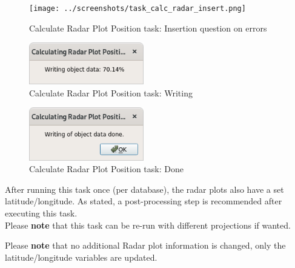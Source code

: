 \begin{figure}[H]
  \center
    \texttt{[image: ../screenshots/task\_calc\_radar\_insert.png]}
  \caption{Calculate Radar Plot Position task: Insertion question on errors}
\end{figure}


\begin{figure}[H]
  \center
    \includegraphics[width=5cm]{../screenshots/task_calc_radar_write.png}
  \caption{Calculate Radar Plot Position task: Writing}
\end{figure}

\begin{figure}[H]
  \center
    \includegraphics[width=5cm]{../screenshots/task_calc_radar_done.png}
  \caption{Calculate Radar Plot Position task: Done}
\end{figure}

After running this task once (per database), the radar plots also have a set latitude/longitude. As stated, a post-processing step is recommended after executing this task. \\

Please \textbf{note} that this task can be re-run with different projections if wanted.

Please \textbf{note} that no additional Radar plot information is changed, only the latitude/longitude variables are updated. 
